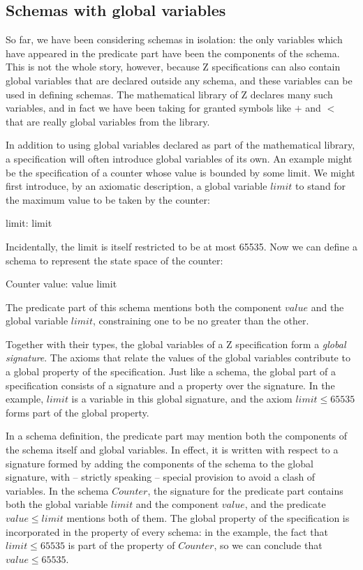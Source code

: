 \subsection{Schemas with global variables}\label{ss:glovar}

\new So far, we have been considering
schemas in isolation: the only variables which have appeared in the
predicate part have been the components
of the schema.  This is not the whole story, however, because Z
specifications can also contain global variables that are declared
outside any schema, and these variables can be used in defining
schemas.  The mathematical library of Z declares many such variables,
and in fact we have been taking for granted symbols like $+$ and
$\lt$ that are really global variables from the library.

In addition to using global variables declared as part of the
mathematical library, a specification will often introduce global
variables of its own.  An example might be the specification of a
counter whose value is bounded by some limit. We
might first introduce, by an axiomatic description, a global
variable $limit$ to stand for the maximum value to be taken by the
counter:
\begin{axdef}
	limit: \nat
\where
	limit 
\end{axdef}
Incidentally, the limit is itself restricted to be at most 65535. Now
we can define a schema to represent the state space of the counter:
\begin{schema}{Counter}
	value: \nat
\where
	value \leq limit
\end{schema}
The predicate part of this schema mentions both the component $value$
and the global variable $limit$, constraining one to be no greater
than the other.

\new Together with their types, the global variables of a Z
specification form a {\em global signature}.%
The axioms that relate the values of the
global variables contribute to a global property of the
specification.  Just like a schema, the global part of a
specification consists of a signature and a property over the
signature.  In the example, $limit$ is a variable in this global
signature, and the axiom $limit \leq 65535$ forms part of the global
property.  

In a schema definition, the predicate part may mention both the
components of the schema itself and global variables.
In effect, it is written with respect to a signature formed by
adding the components of the schema to the global signature, with --
strictly speaking -- special provision to avoid a clash of variables.
In the schema $Counter$, the signature for the predicate part
contains both the global variable $limit$ and the component $value$,
and the predicate $value \leq limit$ mentions both of them.
The global property of the
specification is incorporated in the property of every schema: in
the example, the fact that $limit \leq 65535$ is part of the
property of $Counter$, so we can conclude that $value \leq 65535$.

